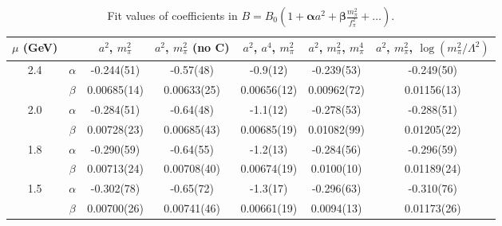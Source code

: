 \documentclass[12pt]{extarticle}
\begin{document}
\begin{table}[h!]
\begin{center}
\begin{tabular}{|c c|c|c|c|c|c|}
\hline
$\mu$ (GeV) &  & $a^2$, $m_\pi^2$& $a^2$, $m_\pi^2$ (no C)& $a^2$, $a^4$, $m_\pi^2$& $a^2$, $m_\pi^2$, $m_\pi^4$& $a^2$, $m_\pi^2$, $\log(m_\pi^2/\Lambda^2)$\\
\hline
\multirow{2}{0.5in}{2.4} & $\alpha$ & -0.244(51)& -0.57(48)& -0.9(12)& -0.239(53)& -0.249(50)\\
 & $\beta$ & 0.00685(14)& 0.00633(25)& 0.00656(12)& 0.00962(72)& 0.01156(13)\\
\hline
\multirow{2}{0.5in}{2.0} & $\alpha$ & -0.284(51)& -0.64(48)& -1.1(12)& -0.278(53)& -0.288(51)\\
 & $\beta$ & 0.00728(23)& 0.00685(43)& 0.00685(19)& 0.01082(99)& 0.01205(22)\\
\hline
\multirow{2}{0.5in}{1.8} & $\alpha$ & -0.290(59)& -0.64(55)& -1.2(13)& -0.284(56)& -0.296(59)\\
 & $\beta$ & 0.00713(24)& 0.00708(40)& 0.00674(19)& 0.0100(10)& 0.01189(24)\\
\hline
\multirow{2}{0.5in}{1.5} & $\alpha$ & -0.302(78)& -0.65(72)& -1.3(17)& -0.296(63)& -0.310(76)\\
 & $\beta$ & 0.00700(26)& 0.00741(46)& 0.00661(19)& 0.0094(13)& 0.01173(26)\\
\hline
\end{tabular}
\caption{Fit values of coefficients in $B = B_0(1 + \mathbf{\alpha} a^2 + \mathbf{\beta} \frac{m_\pi^2}{f_\pi^2} + \ldots)$.}
\end{center}
\end{table}




















\end{document}
